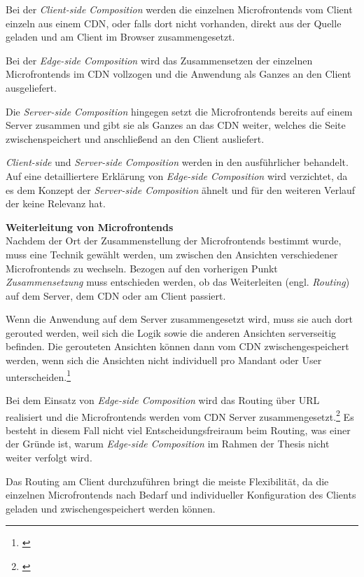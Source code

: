 Bei der \textit{Client-side Composition} werden die einzelnen Microfrontends vom Client einzeln aus einem \gls{CDN}, oder falls dort nicht vorhanden, direkt aus der Quelle geladen und am Client im Browser zusammengesetzt.

Bei der \textit{Edge-side Composition} wird das Zusammensetzen der einzelnen Microfrontends im \gls{CDN} vollzogen und die Anwendung als Ganzes an den Client ausgeliefert.

Die \textit{Server-side Composition} hingegen setzt die Microfrontends bereits auf einem Server zusammen und gibt sie als Ganzes an das \gls{CDN} weiter, welches die Seite zwischenspeichert und anschließend an den Client ausliefert.

\textit{Client-side} und \textit{Server-side Composition} werden in den  ausführlicher behandelt. Auf eine detailliertere Erklärung von \textit{Edge-side Composition} wird verzichtet, da es dem Konzept der\textit{ Server-side Composition} ähnelt und für den weiteren Verlauf der \dokumententyp{} keine Relevanz hat.

\textbf{Weiterleitung von Microfrontends}\\
Nachdem der Ort der Zusammenstellung der Microfrontends bestimmt wurde, muss eine Technik gewählt werden, um zwischen den Ansichten verschiedener Microfrontends zu wechseln. Bezogen auf den vorherigen Punkt \textit{Zusammensetzung} muss entschieden werden, ob das Weiterleiten (engl. \textit{Routing}) auf dem Server, dem \gls{CDN} oder am Client passiert.

Wenn die Anwendung auf dem Server zusammengesetzt wird, muss sie auch dort gerouted werden, weil sich die Logik sowie die anderen Ansichten serverseitig befinden. Die gerouteten Ansichten können dann vom \gls{CDN} zwischengespeichert werden, wenn sich die Ansichten nicht individuell pro Mandant oder User unterscheiden.\footnote{\cite[vgl.][31]{Mezzalira2021}}

Bei dem Einsatz von \textit{Edge-side Composition} wird das Routing über \gls{URL} realisiert und die Microfrontends werden vom \gls{CDN} Server zusammengesetzt.\footnote{\cite[vgl.][32]{Mezzalira2021}} Es besteht in diesem Fall nicht viel Entscheidungsfreiraum beim Routing, was einer der Gründe ist, warum \textit{Edge-side Composition} im Rahmen der Thesis nicht weiter verfolgt wird.

Das Routing am Client durchzuführen bringt die meiste Flexibilität, da die einzelnen Microfrontends nach Bedarf und individueller Konfiguration des Clients geladen und zwischengespeichert werden können.

